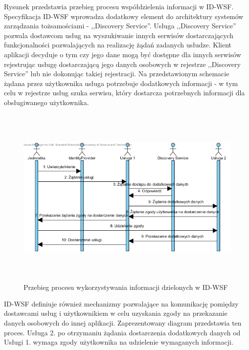 	Rysunek przedstawia przebieg procesu współdzielenia informacji w ID-WSF. Specyfikacja ID-WSF wprowadza dodatkowy element do architektury systemów zarządzania tożsamościami - ,,Discovery Service''. Usługa ,,Discovery Service'' pozwala dostawcom usług na wyszukiwanie innych serwisów dostarczających funkcjonalności pozwalających na realizację żądań zadanych usłudze. Klient aplikacji decyduje o tym czy jego dane mogą być dostępne dla innych serwisów rejestrując usługę dostarczającą jego danych osobowych w rejestrze ,,Discovery Service'' lub nie dokonując takiej rejestracji. Na przedstawionym schemacie żądana przez użytkownika usługa potrzebuje dodatkowych informacji - w tym celu w rejestrze usług szuka serwisu, który dostarcza potrzebnych informacji dla obsługiwanego użytkownika.

	\begin{figure}[h]
		\centering
			\includegraphics[width=15cm,height=9cm]{img/id-wsf.jpg}
		\caption{Przebieg procesu wykorzystywania informacji dzielonych w ID-WSF}
		\label{Przebieg procesu wykorzystywania informacji dzielonych w ID-WSF}
	\end{figure}

	ID-WSF definiuje również mechanizmy pozwalające na komunikację pomiędzy dostawcami usług i użytkownikiem w celu uzyskania zgody na przekazanie danych osobowych do innej aplikacji. Zaprezentowany diagram przedstawia ten proces. Usługa 2. po otrzymaniu żądania dostarczenia dodatkowych danych od Usługi 1. wymaga zgody użytkownika na udzielenie wymaganych informacji.
	

\label{sec:frameworki}

